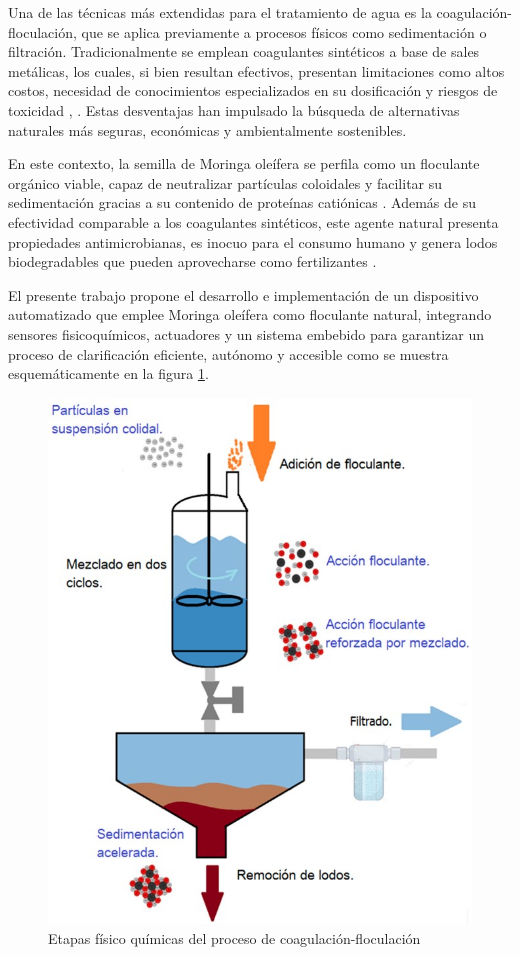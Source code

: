 \documentclass[conference]{IEEEtran}
\begin{document}
	Una de las técnicas más extendidas para el tratamiento de agua es la coagulación-floculación, que se aplica previamente a procesos físicos como sedimentación o filtración. Tradicionalmente se emplean coagulantes sintéticos a base de sales metálicas, los cuales, si bien resultan efectivos, presentan limitaciones como altos costos, necesidad de conocimientos especializados en su dosificación y riesgos de toxicidad \cite{b2}, \cite{b3}. Estas desventajas han impulsado la búsqueda de alternativas naturales más seguras, económicas y ambientalmente sostenibles.
	
	En este contexto, la semilla de Moringa oleífera se perfila como un floculante orgánico viable, capaz de neutralizar partículas coloidales y facilitar su sedimentación gracias a su contenido de proteínas catiónicas \cite{b4}. Además de su efectividad comparable a los coagulantes sintéticos, este agente natural presenta propiedades antimicrobianas, es inocuo para el consumo humano y genera lodos biodegradables que pueden aprovecharse como fertilizantes \cite{b5}.
	
	El presente trabajo propone el desarrollo e implementación de un dispositivo automatizado que emplee Moringa oleífera como floculante natural, integrando sensores fisicoquímicos, actuadores y un sistema embebido para garantizar un proceso de clarificación eficiente, autónomo y accesible como se muestra esquemáticamente en la figura \ref{fig:1}.
	
	\begin{figure}[htbp]
		\centering
		\includegraphics[width=\columnwidth]{fig1.jpg}
		\caption{Etapas físico químicas del proceso de coagulación-floculación}
		\label{fig:1}
	\end{figure}
	
\end{document}
